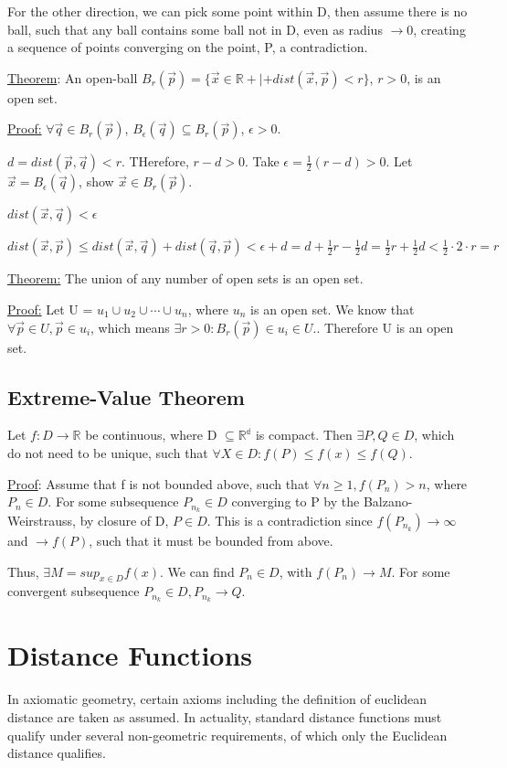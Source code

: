 \documentclass[11 pt, twoside]{article}
\begin{document}
For the other direction, we can pick some point within D, then assume there is no ball, such that any ball contains some ball not in D, even as radius $\to 0$, creating a sequence of points converging on the point, P, a contradiction.

\underline{Theorem}: An open-ball $B_r(\vec{p}) = \{\vec{x} \in \mathbb{R} +|+
dist(\vec{x}, \vec{p}) < r\}$, $r > 0$, is an open set.

\underline{Proof:} $\forall \vec{q} \in B_r(\vec{p})$, $B_\epsilon(\vec{q}) \subseteq
B_r(\vec{p})$, $\epsilon > 0$.

$d = dist(\vec{p}, \vec{q}) < r$. THerefore, $r - d > 0$. Take $\epsilon =
\frac{1}{2} (r - d) > 0$. Let $\vec{x} = B_\epsilon(\vec{q})$, show $\vec{x}
\in B_r(\vec{p})$.

$dist(\vec{x}, \vec{q}) < \epsilon$

$dist(\vec{x}, \vec{p}) \leq dist(\vec{x}, \vec{q}) + dist(\vec{q}, \vec{p}) <
\epsilon + d = d + \frac{1}{2} r - \frac{1}{2} d = \frac{1}{2}r +
\frac{1}{2}d < \frac{1}{2} \cdot 2 \cdot r = r$

\underline{Theorem:} The union of any number of open sets is an open set.

\underline{Proof:} Let U = $u_1 \cup u_2 \cup \cdots \cup u_n$, where $u_n$ is an open set. We know that $\forall \vec{p} \in U, \vec{p} \in u_i$, which means $\exists r > 0: B_r(\vec{p}) \in u_i \in U.$. Therefore U is an open set.

\subsection{Extreme-Value Theorem}
Let $f:D \to \mathbb{R}$ be continuous, where D $\subseteq \mathbb{R^d}$ is compact. Then $\exists P, Q \in D$, which do not need to be unique, such that $\forall X \in D: f(P) \leq f(x) \leq f(Q)$.

\underline{Proof}:
Assume that f is not bounded above, such that $\forall n \geq 1, f(P_n) > n$, where $P_n \in D$. For some subsequence $P_{n_k} \in D$ converging to P by the Balzano-Weirstrauss, by closure of D, $P \in D$. This is a contradiction since $f(P_{n_k}) \to \infty$ and $\to f(P)$, such that it must be bounded from above.

Thus, $\exists M = sup_{x \in D}f(x)$. We can find $P_n \in D$, with $f(P_n) \to M$. For some convergent subsequence $P_{n_k} \in D, P_{n_k} \to Q$.

\section{Distance Functions}
In axiomatic geometry, certain axioms including the definition of euclidean distance are taken as assumed. In actuality, standard distance functions must qualify under several non-geometric requirements, of which only the Euclidean distance qualifies.
\end{document}
